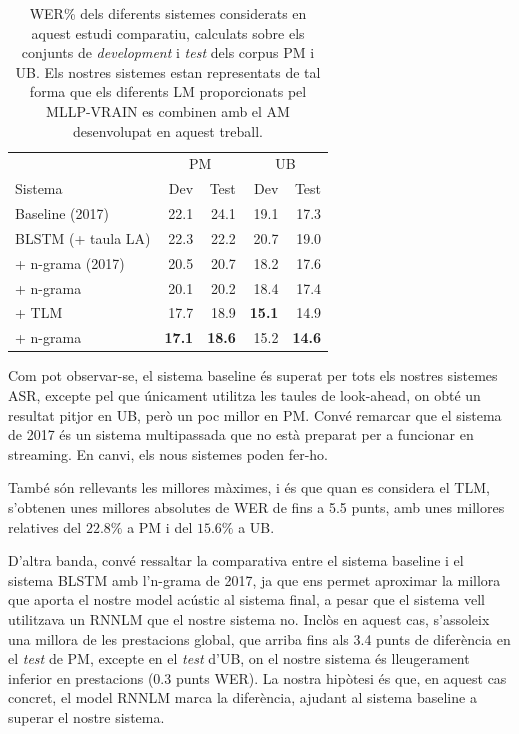 \begin{table}[ht!]
    \centering
    \caption{WER\% dels diferents sistemes considerats en aquest estudi comparatiu, calculats sobre els conjunts de \textit{development} i \textit{test} dels corpus PM i UB. Els nostres sistemes estan representats de tal forma que els diferents LM proporcionats pel MLLP-VRAIN es combinen amb el AM desenvolupat en aquest treball.}
    \begin{tabular}{l|rr|rr}
                             & \multicolumn{2}{c|}{PM} & \multicolumn{2}{c}{UB} \\
        Sistema              & Dev        & Test       & Dev        & Test      \\ \hline
        Baseline (2017) & 22.1       & 24.1       & 19.1       & 17.3      \\
        BLSTM (+ taula LA)               & 22.3       & 22.2       & 20.7       & 19.0      \\
        \quad + n-grama (2017)       & 20.5       & 20.7       & 18.2       & 17.6      \\
        \quad + n-grama            & 20.1       & 20.2       & 18.4       & 17.4      \\
        \quad + TLM                & 17.7       & 18.9       & \textbf{15.1}       & 14.9      \\
        \qquad + n-grama  & \textbf{17.1} & \textbf{18.6} & 15.2  & \textbf{14.6}     
    \end{tabular}
    \label{tab:resum_wer}
\end{table}

Com pot observar-se, el sistema baseline és superat per tots els nostres sistemes ASR, excepte pel que únicament utilitza les taules de look-ahead, on obté un resultat pitjor en UB, però un poc millor en PM. Convé remarcar que el sistema de 2017 és un sistema multipassada que no està preparat per a funcionar en streaming. En canvi, els nous sistemes poden fer-ho.

També són rellevants les millores màximes, i és que quan es considera el TLM, s'obtenen unes millores absolutes de WER de fins a 5.5 punts, amb unes millores relatives del $22.8\%$ a PM i del $15.6\%$ a UB.

D'altra banda, convé ressaltar la comparativa entre el sistema baseline i el sistema BLSTM amb l'n-grama de 2017, ja que ens permet aproximar la millora que aporta el nostre model acústic al sistema final, a pesar que el sistema vell utilitzava un RNNLM que el nostre sistema no. Inclòs en aquest cas, s'assoleix una millora de les prestacions global, que arriba fins als 3.4 punts de diferència en el \textit{test} de PM, excepte en el \textit{test} d'UB, on el nostre sistema és lleugerament inferior en prestacions ($0.3$ punts WER). La nostra hipòtesi és que, en aquest cas concret, el model RNNLM marca la diferència, ajudant al sistema baseline a superar el nostre sistema.
